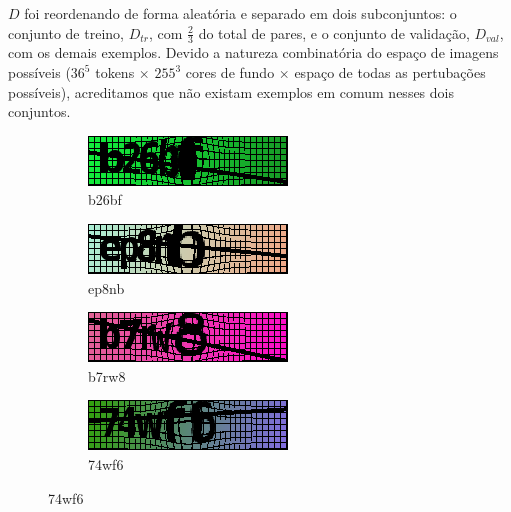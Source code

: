 $D$ foi reordenando de forma aleatória e separado em dois subconjuntos:
o conjunto de treino, $D_{tr}$, com $\frac{2}{3}$ do total de pares, e o conjunto de validação, $D_{val}$, com os demais exemplos. Devido a natureza combinatória do espaço de imagens possíveis ($36^5$ tokens $\times$ $255^3$ cores de fundo $\times$ espaço de todas as pertubações possíveis), acreditamos que não existam exemplos em comum nesses dois conjuntos. 

\begin{figure}[ht]
	\begin{subfigure}{.5\textwidth}
		\centering
	 	\includegraphics[width=.9\linewidth]{figuras/7103_b26bf.png}
		\caption{b26bf}
	\end{subfigure}
	\begin{subfigure}{.5\textwidth}
		\centering
		\includegraphics[width=.9\linewidth]{figuras/9456_ep8nb.png}
		\caption{ep8nb}
	\end{subfigure}%
	\vspace{.05\linewidth}

	\begin{subfigure}{.5\textwidth}
		\centering
		\includegraphics[width=.9\linewidth]{figuras/21856_b7rw8.png}
		\caption{b7rw8}
	\end{subfigure}
	\begin{subfigure}{.5\textwidth}
		\centering
		\includegraphics[width=.9\linewidth]{figuras/19816_74wf6.png}
		\caption{74wf6}
	\end{subfigure}%
	\vspace{.05\linewidth}


\end{figure}
